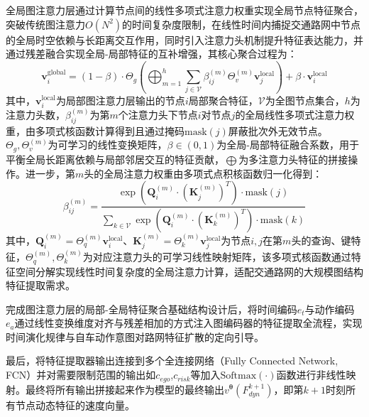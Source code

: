       全局图注意力层通过计算节点间的线性多项式注意力权重实现全局节点特征聚合，突破传统图注意力$O(N^2)$的时间复杂度限制，在线性时间内捕捉交通路网中节点的全局时空依赖与长距离交互作用，同时引入注意力头机制提升特征表达能力，并通过残差融合实现全局-局部特征的互补增强，其核心聚合过程为：
      \begin{equation}
          \mathbf{v}_i^{\text{global}} = (1-\beta) \cdot \Theta_g \left( \bigoplus_{m=1}^h \sum_{j\in \mathcal{V}} \beta_{ij}^{(m)} \Theta_v^{(m)} \mathbf{v}_j^{\text{local}} \right) + \beta \cdot \mathbf{v}_i^{\text{local}}
      \end{equation}
      \noindent 其中，$\mathbf{v}_i^{\text{local}}$为局部图注意力层输出的节点$i$局部聚合特征，$\mathcal{V}$为全图节点集合，$h$为注意力头数，$\beta_{ij}^{(m)}$为第$m$个注意力头下节点$i$对节点$j$的全局线性多项式注意力权重，由多项式核函数计算得到且通过掩码$\text{mask}(j)$屏蔽批次外无效节点。
      $\Theta_g, \Theta_v^{(m)}$为可学习的线性变换矩阵，$\beta \in (0,1)$为全局-局部特征融合系数，用于平衡全局长距离依赖与局部邻居交互的特征贡献，$\bigoplus$为多注意力头特征的拼接操作。进一步，第$m$头的全局注意力权重由多项式点积核函数归一化得到：
      \begin{equation}
          \beta_{ij}^{(m)} = \frac{\exp\left( \mathbf{Q}_i^{(m)} \cdot (\mathbf{K}_j^{(m)})^T \right) \cdot \text{mask}(j)}{\sum_{k\in \mathcal{V}} \exp\left( \mathbf{Q}_i^{(m)} \cdot (\mathbf{K}_k^{(m)})^T \right) \cdot \text{mask}(k)}
      \end{equation}
      \noindent 其中，$\mathbf{Q}_i^{(m)} = \Theta_q^{(m)} \mathbf{v}_i^{\text{local}}$、$\mathbf{K}_j^{(m)} = \Theta_k^{(m)} \mathbf{v}_j^{\text{local}}$为节点$i,j$在第$m$头的查询、键特征，$\Theta_q^{(m)},\Theta_k^{(m)}$为对应注意力头的可学习线性映射矩阵，该多项式核函数通过特征空间分解实现线性时间复杂度的全局注意力计算，适配交通路网的大规模图结构特征提取需求。

      完成图注意力层的局部-全局特征聚合基础结构设计后，将时间编码$e_t$与动作编码$e_a$通过线性变换维度对齐与残差相加的方式注入图编码器的特征提取全流程，实现时间演化规律与自车动作意图对路网特征扩散的定向引导。

      最后，将特征提取器输出连接到多个全连接网络（Fully Connected Network, FCN）并对需要限制范围的输出如$c_{ego}$,$c_{risk}$等加入$\text{Softmax}(\cdot)$函数进行非线性映射。最终将所有输出拼接起来作为模型的最终输出$v^\bm{\theta}(F_{dyn}^{k+1})$，即第$k+1$时刻所有节点动态特征的速度向量。

